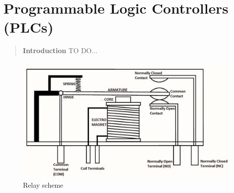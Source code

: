 \chapter{Programmable Logic Controllers (PLCs)}
\begin{quotation}
    \textsf{\textbf{Introduction} TO DO...}
\end{quotation}
\minitoc

\begin{figure}[h]
    \centering
    \includegraphics[scale=0.4]{img/relay_scheme.jpg}
    \caption{Relay scheme }    
\end{figure}
\vspace{-0.5cm}
